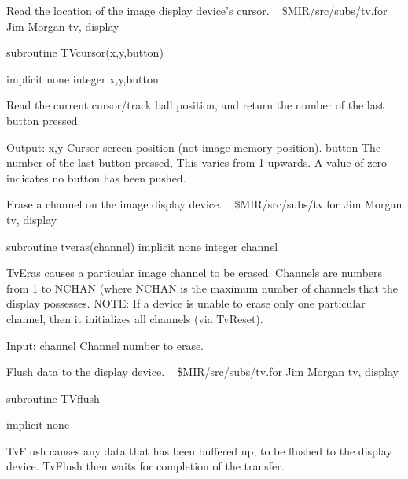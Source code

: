 %
\noindent Read the location of the image display device's cursor.
\newline \ 
\newline {} \$MIR/src/subs/tv.for
\newline {} Jim Morgan
\newline {} tv, display
\par{\tenpoint
{\eightpoint\begintt
        subroutine TVcursor(x,y,button)

        implicit none
        integer x,y,button

  Read the current cursor/track ball position, and return the number of
  the last button pressed.

  Output:
    x,y        Cursor screen position (not image memory position).
    button     The number of the last button pressed, This varies from
               1 upwards. A value of zero indicates no button has been
               pushed.
\endtt}
\par}
%
\noindent Erase a channel on the image display device.
\newline \ 
\newline {} \$MIR/src/subs/tv.for
\newline {} Jim Morgan
\newline \abox{Keywords:} tv, display
\par{\tenpoint
{\eightpoint\begintt
        subroutine tveras(channel)
        implicit none
        integer channel

  TvEras causes a particular image channel to be erased.
  Channels are numbers from 1 to NCHAN (where NCHAN is the
  maximum number of channels that the display possesses.
  NOTE: If a device is unable to erase only one particular
  channel, then it initializes all channels (via TvReset).

  Input:
    channel    Channel number to erase.
\endtt}
\par}
%
\noindent Flush data to the display device.
\newline \ 
\newline {} \$MIR/src/subs/tv.for
\newline \abox{Responsible:} Jim Morgan
\newline {} tv, display
\par{\tenpoint
{\eightpoint\begintt
        subroutine TVflush

        implicit none

  TvFlush causes any data that has been buffered up, to be flushed to the
  display device. TvFlush then waits for completion of the transfer.
\endtt}
\par}
